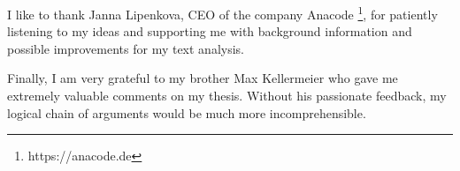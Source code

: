 I like to thank Janna Lipenkova, CEO of the company Anacode \footnote{https://anacode.de}, for patiently listening to my ideas and supporting me with background information and possible improvements for my text analysis.

Finally, I am very grateful to my brother Max Kellermeier who gave me extremely valuable comments on my thesis. Without his passionate feedback, my logical chain of arguments would be much more incomprehensible.






